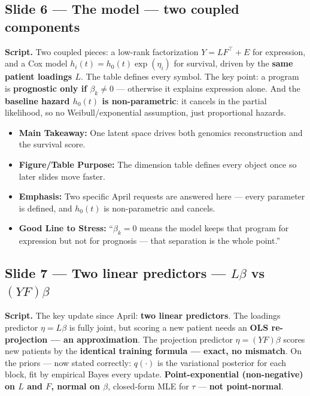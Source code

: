 \documentclass[11pt]{article}
\newcommand{\scriptlabel}{\textbf{Script. }}
\newcommand{\sectionlabel}[1]{\textbf{#1}}
\newcommand{\key}[1]{\textcolor{keyblue}{\textbf{#1}}}        %
\begin{document}
\subsection*{Slide 6 --- The model --- two coupled components}
\scriptlabel Two coupled pieces: a low-rank factorization $Y = LF^\top + E$ for expression, and a
Cox model $h_i(t) = h_0(t)\exp(\eta_i)$ for survival, driven by the \key{same patient loadings $L$}.
The table defines every symbol. The key point: a program is \key{prognostic only if $\beta_k \neq
0$} --- otherwise it explains expression alone. And the \key{baseline hazard $h_0(t)$ is
non-parametric}: it cancels in the partial likelihood, so no Weibull/exponential assumption, just
proportional hazards.

\begin{itemize}
\item \sectionlabel{Main Takeaway:} One latent space drives both genomics reconstruction and the
survival score.
\item \sectionlabel{Figure/Table Purpose:} The dimension table defines every object once so later
slides move faster.
\item \sectionlabel{Emphasis:} Two specific April requests are answered here --- every parameter is
defined, and $h_0(t)$ is non-parametric and cancels.
\item \sectionlabel{Good Line to Stress:} ``$\beta_k = 0$ means the model keeps that program for
expression but not for prognosis --- that separation is the whole point.''
\end{itemize}

\subsection*{Slide 7 --- Two linear predictors --- $L\beta$ vs $(YF)\beta$}
\scriptlabel The key update since April: \key{two linear predictors}. The loadings predictor
$\eta = L\beta$ is fully joint, but scoring a new patient needs an \key{OLS re-projection --- an
approximation}. The projection predictor $\eta = (YF)\beta$ scores new patients by the \key{identical
training formula --- exact, no mismatch}. On the priors --- now stated correctly: $q(\cdot)$ is the
variational posterior for each block, fit by empirical Bayes every update. \key{Point-exponential
(non-negative) on $L$ and $F$, normal on $\beta$}, closed-form MLE for $\tau$ --- \key{not
point-normal}.
\end{document}
